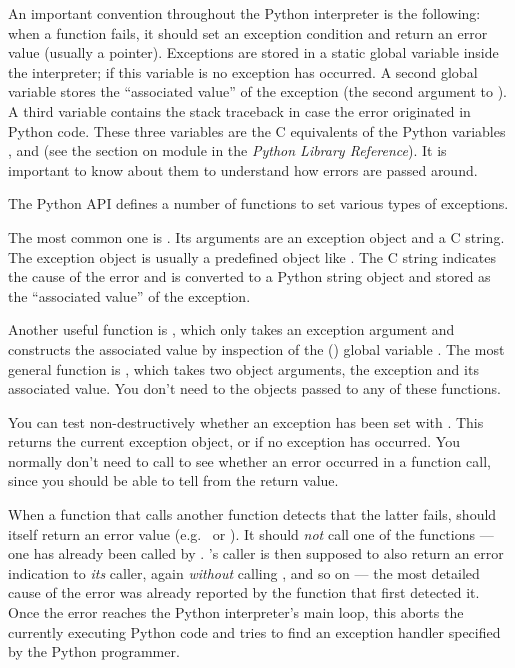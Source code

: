\documentclass{manual}
\begin{document}
An important convention throughout the Python interpreter is the
following: when a function fails, it should set an exception condition
and return an error value (usually a \NULL{} pointer).  Exceptions
are stored in a static global variable inside the interpreter; if this
variable is \NULL{} no exception has occurred.  A second global
variable stores the ``associated value'' of the exception (the second
argument to ).  A third variable contains the stack
traceback in case the error originated in Python code.  These three
variables are the C equivalents of the Python variables
,  and  (see
the section on module  in the \emph{Python Library
Reference}).  It is important to know about them to understand how
errors are passed around.

The Python API defines a number of functions to set various types of
exceptions.

The most common one is .  Its arguments
are an exception object and a C string.  The exception object is
usually a predefined object like .  The
C string indicates the cause of the error and is converted to a
Python string object and stored as the ``associated value'' of the
exception.

Another useful function is , which only
takes an exception argument and constructs the associated value by
inspection of the (\UNIX{}) global variable .  The most
general function is , which takes two object
arguments, the exception and its associated value.  You don't need to
 the objects passed to any of these functions.

You can test non-destructively whether an exception has been set with
.  This returns the current exception object,
or \NULL{} if no exception has occurred.  You normally don't need
to call  to see whether an error occurred in a
function call, since you should be able to tell from the return value.

When a function  that calls another function  detects
that the latter fails,  should itself return an error value
(e.g.\ \NULL{} or ).  It should \emph{not} call one of the
 functions --- one has already been called by .
's caller is then supposed to also return an error indication
to \emph{its} caller, again \emph{without} calling ,
and so on --- the most detailed cause of the error was already
reported by the function that first detected it.  Once the error
reaches the Python interpreter's main loop, this aborts the currently
executing Python code and tries to find an exception handler specified
by the Python programmer.
\end{document}
